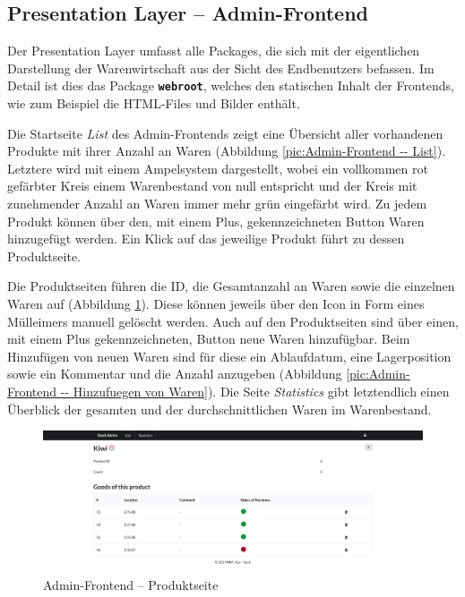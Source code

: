 \newpage
\subsection{Presentation Layer -- Admin-Frontend}
\label{subsec: Presentation Layer}
Der Presentation Layer umfasst alle  Packages, die sich mit der eigentlichen Darstellung der Warenwirtschaft aus der Sicht des Endbenutzers befassen. Im Detail ist dies das Package \textbf{\texttt{webroot}}, welches den statischen Inhalt der Frontends, wie zum Beispiel die HTML-Files und Bilder enthält. \par 
Die Startseite \textit{List} des Admin-Frontends zeigt eine Übersicht aller vorhandenen Produkte mit ihrer Anzahl an Waren (Abbildung \ref{pic:Admin-Frontend -- List}). Letztere wird mit einem Ampelsystem dargestellt, wobei ein vollkommen rot gefärbter Kreis einem Warenbestand von null entspricht und der Kreis mit zunehmender Anzahl an Waren immer mehr grün eingefärbt wird. Zu jedem Produkt können über den, mit einem  Plus, gekennzeichneten Button Waren hinzugefügt werden. Ein Klick auf das jeweilige Produkt führt zu dessen Produktseite. \par 
Die Produktseiten führen die ID, die Gesamtanzahl an Waren sowie die einzelnen Waren auf (Abbildung \ref{pic:Admin-Frontend -- Produktseite}). Diese können jeweils über den Icon in Form eines Mülleimers manuell gelöscht werden. Auch auf den Produktseiten sind über einen, mit einem Plus gekennzeichneten, Button neue Waren hinzufügbar. Beim Hinzufügen von neuen Waren sind für diese ein Ablaufdatum, eine Lagerposition sowie ein Kommentar und die Anzahl anzugeben (Abbildung \ref{pic:Admin-Frontend -- Hinzufuegen von Waren}). Die Seite \textit{Statistics} gibt letztendlich einen Überblick der gesamten und der durchschnittlichen Waren im Warenbestand.

\begin{figure}[H]
	\centering
	\includegraphics[width=0.75 \textwidth]{./pics/product.png}
	\caption{Admin-Frontend -- Produktseite}
	\label{pic:Admin-Frontend -- Produktseite}
\end{figure}


